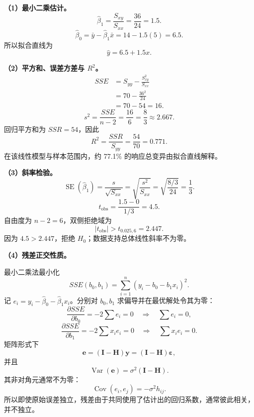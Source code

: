\documentclass[11pt,a4paper]{article}
\newcommand{\Var}{\operatorname{Var}}
\newcommand{\Cov}{\operatorname{Cov}}
\newcommand{\SE}{\operatorname{SE}}
\newcommand{\by}{\mathbf{y}}
\newcommand{\be}{\mathbf{e}}
\newcommand{\bvarepsilon}{\boldsymbol{\varepsilon}}
\begin{document}
\begin{solutionbox}
\textbf{（1）最小二乘估计。}
\[
  \hat\beta_1
  =
  \frac{S_{xy}}{S_{xx}}
  =
  \frac{36}{24}
  =
  1.5.
\]
\[
  \hat\beta_0
  =
  \bar y-\hat\beta_1\bar x
  =
  14-1.5(5)
  =
  6.5.
\]
所以拟合直线为
\[
  \boxed{\hat y=6.5+1.5x.}
\]

\textbf{（2）平方和、误差方差与 $R^2$。}
\[
\begin{aligned}
  SSE
  &=
  S_{yy}-\frac{S_{xy}^2}{S_{xx}}\\
  &=
  70-\frac{36^2}{24}\\
  &=
  70-54
  =
  \boxed{16}.
\end{aligned}
\]
\[
  s^2
  =
  \frac{SSE}{n-2}
  =
  \frac{16}{6}
  =
  \boxed{\frac83\approx2.667}.
\]
回归平方和为 $SSR=54$，因此
\[
  R^2
  =
  \frac{SSR}{S_{yy}}
  =
  \frac{54}{70}
  =
  \boxed{0.771}.
\]
在该线性模型与样本范围内，约 77.1\% 的响应总变异由拟合直线解释。

\textbf{（3）斜率检验。}
\[
  \SE(\hat\beta_1)
  =
  \frac{s}{\sqrt{S_{xx}}}
  =
  \sqrt{\frac{s^2}{S_{xx}}}
  =
  \sqrt{\frac{8/3}{24}}
  =
  \frac13.
\]
\[
  t_{\mathrm{obs}}
  =
  \frac{1.5-0}{1/3}
  =
  4.5.
\]
自由度为 $n-2=6$，双侧拒绝域为
\[
  |t_{\mathrm{obs}}|>t_{0.025,6}=2.447.
\]
因为 $4.5>2.447$，拒绝 $H_0$；数据支持总体线性斜率不为零。

\textbf{（4）残差正交性质。}

最小二乘法最小化
\[
  SSE(b_0,b_1)=\sum_{i=1}^n(y_i-b_0-b_1x_i)^2.
\]
记 $e_i=y_i-\hat\beta_0-\hat\beta_1x_i$。分别对 $b_0,b_1$ 求偏导并在最优解处令其为零：
\[
  \frac{\partial SSE}{\partial b_0}
  =
  -2\sum e_i=0
  \quad\Longrightarrow\quad
  \boxed{\sum e_i=0},
\]
\[
  \frac{\partial SSE}{\partial b_1}
  =
  -2\sum x_ie_i=0
  \quad\Longrightarrow\quad
  \boxed{\sum x_ie_i=0}.
\]
矩阵形式下
\[
  \be=(\mathbf I-\mathbf H)\by
  =
  (\mathbf I-\mathbf H)\bvarepsilon,
\]
并且
\[
  \Var(\be)=\sigma^2(\mathbf I-\mathbf H).
\]
其非对角元通常不为零：
\[
  \Cov(e_i,e_j)=-\sigma^2h_{ij}.
\]
所以即使原始误差独立，残差由于共同使用了估计出的回归系数，通常彼此相关，并不独立。
\end{solutionbox}
\end{document}
